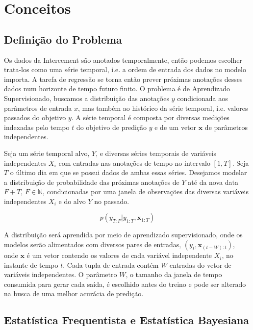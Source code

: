 \chapter{Conceitos}
\label{cap:conceitos}


\section{Definição do Problema}


Os dados da Intercement são anotados temporalmente, então podemos escolher
trata-los como uma série temporal, i.e. a ordem de entrada dos dados no modelo
importa. A tarefa de regressão se torna então prever próximas anotações desses
dados num horizonte de tempo futuro finito. O problema é de Aprendizado
Supervisionado, buscamos a distribuição das anotações $y$ condicionada
aos parâmetros de entrada $x$, mas também ao
histórico da série temporal, i.e. valores passados do objetivo $y$. A série
temporal é composta por diversas medições indexadas pelo tempo $t$ do objetivo
de predição $y$ e de um vetor $\textbf{x}$ de parâmetros independentes.


Seja um série temporal alvo, $Y$, e diversas séries temporais de variáveis
independentes $X_i$ com entradas nas anotações de tempo no intervalo $[1,T]$. Seja $T$ o último dia em que se possui dados de ambas essas
séries. Desejamos modelar a distribuição de probabilidade das próximas anotações
de $Y$ até da nova data $F + T$, $F \in \mathbb{N}$, condicionadas por uma janela de
observações das diversas variáveis independentes $X_i$ e do alvo $Y$ no passado.

\[ p(y_{T:F} | y_{1:T},\textbf{x}_{{1}:T}) \]

A distribuição será aprendida por meio de aprendizado supervisionado, onde os
modelos serão alimentados com diversos pares de entradas,
$(y_t,\textbf{x}_{(t-W):t})$, onde $\textbf{x}$ é um vetor contendo os valores de
cada variável independente $X_i$, no instante de tempo $t$. Cada tupla de
entrada contém $W$ entradas do vetor de variáveis independentes. O parâmetro $W$, o
tamanho da janela de tempo consumida para gerar cada saída, é escolhido antes do
treino e pode ser alterado na busca de uma melhor acurácia de predição.

\section{Estatística Frequentista e Estatística Bayesiana}
 
